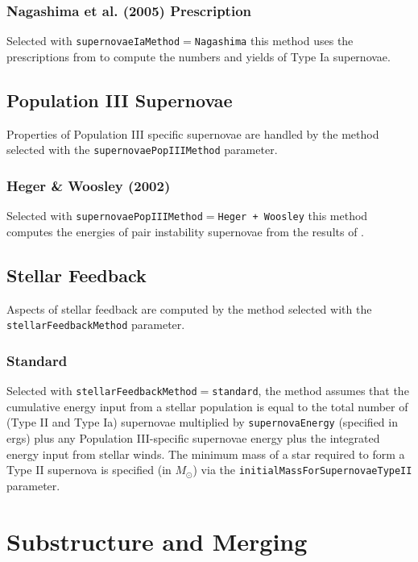 \subsubsection{Nagashima et al. (2005) Prescription}

Selected with {\tt supernovaeIaMethod}$=${\tt Nagashima} this method uses the prescriptions from \cite{nagashima_metal_2005} to compute the numbers and yields of Type Ia supernovae.

\subsection{Population III Supernovae}

Properties of Population III specific supernovae are handled by the method selected with the {\tt supernovaePopIIIMethod} parameter.

\subsubsection{Heger \& Woosley (2002)}

Selected with {\tt supernovaePopIIIMethod}$=${\tt Heger + Woosley} this method computes the energies of pair instability supernovae from the results of \cite{heger_nucleosynthetic_2002}.

\subsection{Stellar Feedback}

Aspects of stellar feedback are computed by the method selected with the {\tt stellarFeedbackMethod} parameter.

\subsubsection{Standard}

Selected with {\tt stellarFeedbackMethod}$=${\tt standard}, the method assumes that the cumulative energy input from a stellar population is equal to the total number of (Type II and Type Ia) supernovae multiplied by {\tt supernovaEnergy} (specified in ergs) plus any Population III-specific supernovae energy plus the integrated energy input from stellar winds. The minimum mass of a star required to form a Type II supernova is specified (in $M_\odot$) via the {\tt initialMassForSupernovaeTypeII} parameter.

\section{Substructure and Merging}

